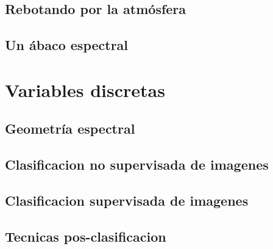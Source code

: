 \documentclass[a4paper]{book}
\begin{document}
\chapter{Rebotando por la atm\'osfera}
\label{rebotando}


\chapter{Un \'abaco espectral}
\label{abaco}


\part{Variables discretas}

\chapter{Geometr\'ia espectral}
\label{rotaciones}


\chapter{Clasificacion no supervisada de imagenes}
\label{otrolado}


\chapter{Clasificacion supervisada de imagenes}
\label{educando}


\chapter{Tecnicas pos-clasificacion}
\label{pos}

\newpage
\end{document}
